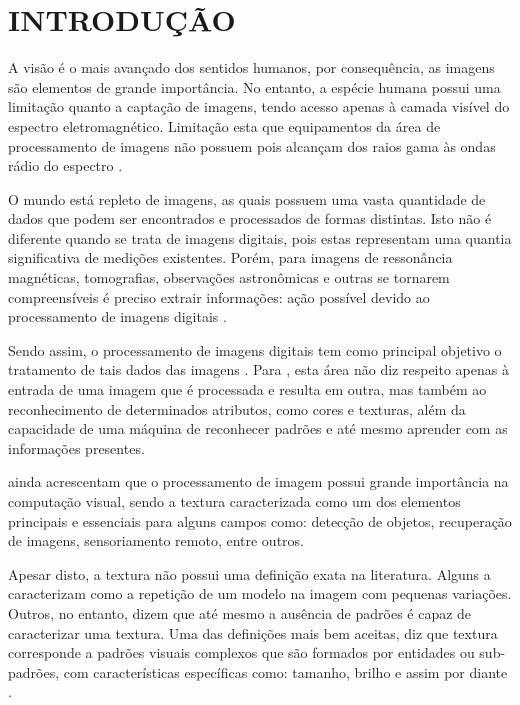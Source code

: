 
\chapter{INTRODUÇÃO}
\label{chap:introducao}

\par A visão é o mais avançado dos sentidos humanos, por consequência, as imagens são elementos de grande importância. No entanto, a espécie humana possui uma limitação quanto a captação de imagens, tendo acesso apenas à camada visível do espectro eletromagnético. Limitação esta que equipamentos da área de processamento de imagens não possuem pois alcançam dos raios gama às ondas rádio do espectro \cite{valencca2011monitorizaccao}.

\par O mundo está repleto de imagens, as quais possuem uma vasta quantidade de dados que podem ser encontrados e processados de formas distintas. Isto não é diferente quando se trata de imagens digitais, pois estas representam uma quantia significativa de medições existentes. Porém, para imagens de ressonância magnéticas, tomografias, observações astronômicas e outras se tornarem compreensíveis é preciso extrair informações: ação possível devido ao processamento de imagens digitais \cite{ScikitImage}.

\par Sendo assim, o processamento de imagens digitais tem como principal objetivo o tratamento de tais dados das imagens \cite{ScikitImage}. Para , esta área não diz respeito apenas à entrada de uma imagem que é processada e resulta em outra, mas também ao reconhecimento de determinados atributos, como cores e texturas, além da capacidade de uma máquina de reconhecer padrões e até mesmo aprender com as informações presentes.

\par {} ainda acrescentam que o processamento de imagem possui grande importância na computação visual, sendo a textura caracterizada como um dos elementos principais e essenciais para alguns campos como: detecção de objetos, recuperação de imagens, sensoriamento remoto, entre outros. 

\par Apesar disto, a textura não possui uma definição exata na literatura. Alguns a caracterizam como a repetição de um modelo na imagem com pequenas variações. Outros, no entanto, dizem que até mesmo a ausência de padrões é capaz de caracterizar uma textura. Uma das definições mais bem aceitas, diz que textura corresponde a padrões visuais complexos que são formados por entidades ou sub-padrões, com características específicas como: tamanho, brilho e assim por diante \cite{jarbas-color-texture}. 

